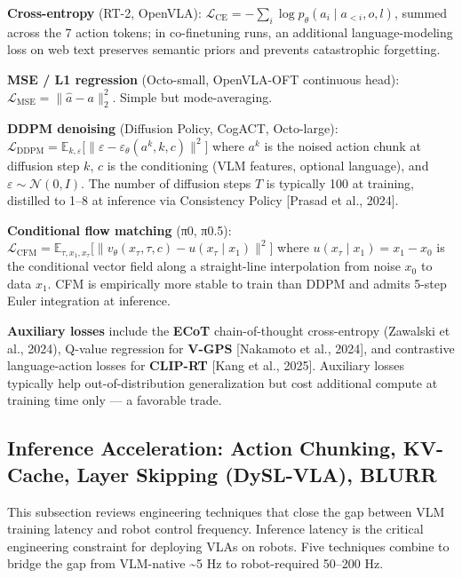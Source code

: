 \textbf{Cross-entropy} (RT-2, OpenVLA): \(\mathcal{L}_{\text{CE}} = -\sum_{i} \log p_\theta(a_i \mid a_{<i}, o, l)\), summed across the 7 action tokens; in co-finetuning runs, an additional language-modeling loss on web text preserves semantic priors and prevents catastrophic forgetting.

\textbf{MSE / L1 regression} (Octo-small, OpenVLA-OFT continuous head): \(\mathcal{L}_{\text{MSE}} = \|\hat{a} - a\|_2^2\). Simple but mode-averaging.

\textbf{DDPM denoising} (Diffusion Policy, CogACT, Octo-large): \(\mathcal{L}_{\text{DDPM}} = \mathbb{E}_{k, \varepsilon}\big[\|\varepsilon - \varepsilon_\theta(a^k, k, c)\|^2\big]\) where \(a^k\) is the noised action chunk at diffusion step \(k\), \(c\) is the conditioning (VLM features, optional language), and \(\varepsilon \sim \mathcal{N}(0, I)\). The number of diffusion steps \(T\) is typically 100 at training, distilled to 1--8 at inference via Consistency Policy {[}Prasad et al., 2024{]}.

\textbf{Conditional flow matching} (π0, π0.5): \(\mathcal{L}_{\text{CFM}} = \mathbb{E}_{\tau, x_1, x_\tau}\big[\|v_\theta(x_\tau, \tau, c) - u(x_\tau \mid x_1)\|^2\big]\) where \(u(x_\tau \mid x_1) = x_1 - x_0\) is the conditional vector field along a straight-line interpolation from noise \(x_0\) to data \(x_1\). CFM is empirically more stable to train than DDPM and admits 5-step Euler integration at inference.

\textbf{Auxiliary losses} include the \textbf{ECoT} chain-of-thought cross-entropy (Zawalski et al., 2024), Q-value regression for \textbf{V-GPS} {[}Nakamoto et al., 2024{]}, and contrastive language-action losses for \textbf{CLIP-RT} {[}Kang et al., 2025{]}. Auxiliary losses typically help out-of-distribution generalization but cost additional compute at training time only --- a favorable trade.

\subsection{Inference Acceleration: Action Chunking, KV-Cache, Layer Skipping (DySL-VLA), BLURR}\label{inference-acceleration-action-chunking-kv-cache-layer-skipping-dysl-vla-blurr}

This subsection reviews engineering techniques that close the gap between VLM training latency and robot control frequency. Inference latency is the critical engineering constraint for deploying VLAs on robots. Five techniques combine to bridge the gap from VLM-native \textasciitilde5 Hz to robot-required 50--200 Hz.

